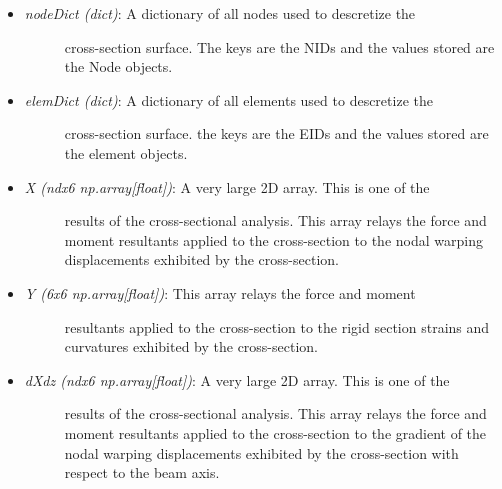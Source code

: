 \documentclass[letterpaper,10pt,english]{sphinxmanual}
\begin{document}
\begin{fulllineitems}
\begin{itemize}
\begin{description}
\end{description}

\item {} \begin{description}
\item[{\emph{nodeDict (dict)}: A dictionary of all nodes used to descretize the}] \leavevmode
cross-section surface. The keys are the NIDs and the values stored
are the Node objects.

\end{description}

\item {} \begin{description}
\item[{\emph{elemDict (dict)}: A dictionary of all elements used to descretize the}] \leavevmode
cross-section surface. the keys are the EIDs and the values stored
are the element objects.

\end{description}

\item {} \begin{description}
\item[{\emph{X (ndx6 np.array{[}float{]})}: A very large 2D array. This is one of the}] \leavevmode
results of the cross-sectional analysis. This array relays the
force and moment resultants applied to the cross-section to the
nodal warping displacements exhibited by the cross-section.

\end{description}

\item {} \begin{description}
\item[{\emph{Y (6x6 np.array{[}float{]})}: This array relays the force and moment}] \leavevmode
resultants applied to the cross-section to the rigid section
strains and curvatures exhibited by the cross-section.

\end{description}

\item {} \begin{description}
\item[{\emph{dXdz (ndx6 np.array{[}float{]})}: A very large 2D array. This is one of the}] \leavevmode
results of the cross-sectional analysis. This array relays the
force and moment resultants applied to the cross-section to the
gradient of the nodal warping displacements exhibited by the
cross-section with respect to the beam axis.


\end{description}
\end{itemize}
\end{fulllineitems}
\end{document}
